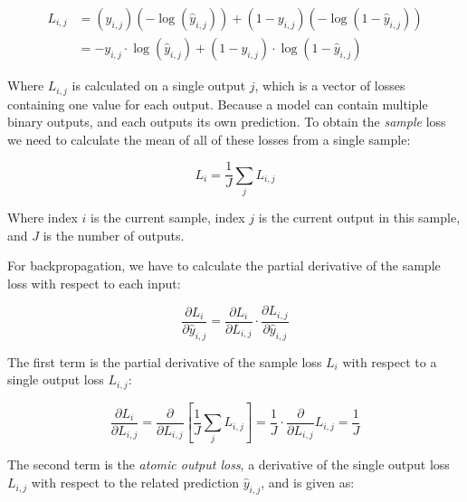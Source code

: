 \documentclass[a4paper]{report}
\begin{document}
\begin{align*}
    L_{i,j} &= (y_{i,j})(-\log(\hat{y}_{i,j})) + (1-y_{i,j})(-\log(1-\hat{y}_{i,j})) \\
    &= -y_{i,j} \cdot \log(\hat{y}_{i,j}) + (1-y_{i,j}) \cdot \log(1-\hat{y}_{i,j})
\end{align*}

Where $L_{i,j}$ is calculated on a single output $j$, which is a vector of losses containing one value for each output. Because a model can contain multiple binary outputs, and each outputs its own prediction. To obtain the \emph{sample} loss we need to calculate the mean of all of these losses from a single sample:

\begin{equation*}
    L_i = \frac{1}{J}\sum_{j}L_{i,j}
\end{equation*}

Where index $i$ is the current sample, index $j$ is the current output in this sample, and $J$ is the number of outputs.

For backpropagation, we have to calculate the partial derivative of the sample loss with respect to
each input:

\begin{equation*}
    \frac{\partial L_i}{\partial\hat{y}_{i,j}} = \frac{\partial L_i}{\partial L_{i,j}} \cdot \frac{\partial L_{i,j}}{\partial\hat{y}_{i,j}}
\end{equation*}

The first term is the partial derivative of the sample loss $L_i$ with respect to a single output loss $L_{i,j}$:

\begin{equation*}
    \frac{\partial L_i}{\partial L_{i,j}} = \frac{\partial}{\partial L_{i,j}} [ \frac{1}{J}\sum_j L_{i,j} ] = \frac{1}{J} \cdot \frac{\partial}{\partial L_{i,j}} L_{i,j} = \frac{1}{J}
\end{equation*}

The second term is the \emph{atomic output loss}, a derivative of the single output loss $L_{i,j}$ with respect to the related prediction $\hat{y}_{i,j}$, and is given as:
\end{document}
